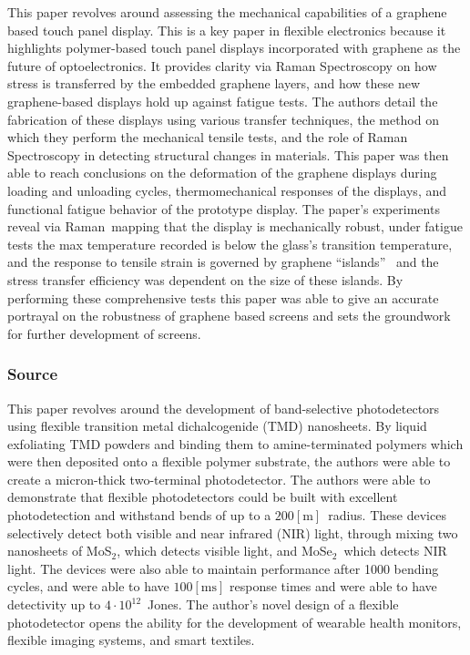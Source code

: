 \documentclass[conference]{IEEEtran}
\begin{document}
This paper revolves around assessing the mechanical capabilities of a graphene based touch panel display. This is a key paper in flexible electronics because it highlights polymer-based touch panel displays incorporated with graphene as the future of optoelectronics. It provides clarity via Raman Spectroscopy on how stress is transferred by the embedded graphene layers, and how these new graphene-based displays hold up against fatigue tests. The authors detail the fabrication of these displays using various transfer techniques, the method on which they perform the mechanical tensile tests, and the role of Raman Spectroscopy in detecting structural changes in materials. This paper was then able to reach conclusions on the deformation of the graphene displays during loading and unloading cycles, thermomechanical responses of the displays, and functional fatigue behavior of the prototype display. The paper's experiments reveal via Raman mapping that the display is mechanically robust, under fatigue tests the max temperature recorded is below the glass’s transition temperature, and the response to tensile strain is governed by graphene ``islands''  and the stress transfer efficiency was dependent on the size of these islands. By performing these comprehensive tests this paper was able to give an accurate portrayal on the robustness of graphene based screens and sets the groundwork for further development of screens.

\subsubsection{Source \cite{tc9}}
 
This paper revolves around the development of band-selective photodetectors using flexible transition metal dichalcogenide (TMD) nanosheets. By liquid exfoliating TMD powders and binding them to amine-terminated polymers which were then deposited onto a flexible polymer substrate, the authors were able to create a micron-thick two-terminal photodetector. The authors were able to demonstrate that flexible photodetectors could be built with excellent photodetection and withstand bends of up to a $200[\si{\meter}]$ radius. These devices selectively detect both visible and near infrared (NIR) light, through mixing two nanosheets of MoS$_2$, which detects visible light, and MoSe$_2$ which detects NIR light. The devices were also able to maintain performance after 1000 bending cycles, and were able to have $100[\si{\milli\second}]$ response times and were able to have detectivity up to $4\cdot10^{12}$ Jones. The author's novel design of a flexible photodetector opens the ability for the development of wearable health monitors, flexible imaging systems, and smart textiles.
\end{document}
